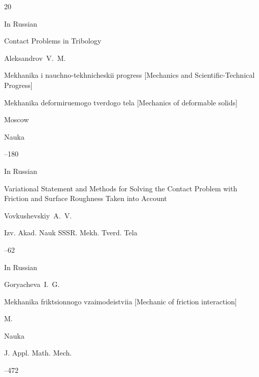 \begin{thebibliography}{20}




\lang In Russian

\paper Contact Problems in Tribology

\by Aleksandrov~V.~M.

\inbook Mekhanika i nauchno-tekhnicheskii progress \rm [Mechanics and Scientific-Technical Progress]


\volinfo Mekhanika deformiruemogo tverdogo tela [Mechanics of deformable solids]


\publaddr Moscow

\publ Nauka

--180






\lang In Russian

\paper Variational Statement and Methods for Solving the Contact Problem with Friction and Surface Roughness Taken into Account

\by Vovkushevskiy~A.~V.

\jour Izv. Akad. Nauk SSSR. Mekh. Tverd. Tela



--62




\lang In Russian

\by Goryacheva~I.~G.

\book Mekhanika friktsionnogo vzaimodeistviia \rm [Mechanic of friction interaction]

\publaddr  M.

\publ Nauka








\jour J. Appl. Math. Mech.




–472


\end{thebibliography}
